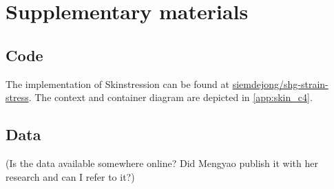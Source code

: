 \section{Supplementary materials}
\subsection{Code}
The implementation of Skinstression can be found at \href{https://github.io/siemdejong/shg-strain-stress}{ siemdejong/shg-strain-stress}.
The context and container diagram are depicted in \cref{app:skin_c4}.

\subsection{Data}
(Is the data available somewhere online?
Did Mengyao publish it with her research and can I refer to it?)